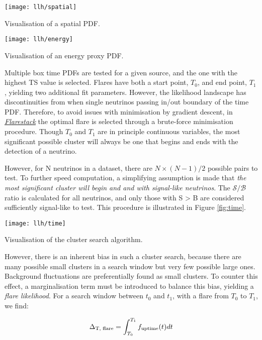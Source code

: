 \begin{marginfigure}
	\centering \texttt{[image: llh/spatial]}
	\caption{Visualisation of a spatial PDF.}
	\label{fig:spatial}
\end{marginfigure}

\begin{marginfigure}
	\centering \texttt{[image: llh/energy]}
	\caption{Visualisation of an energy proxy PDF.}
	\label{fig:energy}
\end{marginfigure}

Multiple box time PDFs are tested for a given source, and the one with the highest TS value is selected. Flares have both a start point, $T_{0}$, and end point, $T_{1}$, yielding two additional fit parameters. However, the likelihood landscape has discontinuities from when single neutrinos passing in/out boundary of the time PDF. Therefore, to avoid issues with minimisation by gradient descent, in \emph{\href{https://github.com/IceCubeOpenSource/flarestack}{Flarestack}} the optimal flare is selected through a brute-force minimisation procedure. Though $T_{0}$ and $T_{1}$ are in principle continuous variables, the most significant possible cluster will always be one that begins and ends with the detection of a neutrino.

However, for N neutrinos in a dataset, there are $N \times (N-1)/2$ possible pairs to test. To further speed computation, a simplifying assumption is made that \emph{the most significant cluster will begin and and with signal-like neutrinos}. The $\mathcal{S}/\mathcal{B}$ ratio is calculated for all neutrinos, and only those with S > B are considered sufficiently signal-like to test. This procedure is illustrated in Figure \ref{fig:time}.

\begin{marginfigure}
	\centering \texttt{[image: llh/time]}
	\caption{Visualisation of the cluster search algorithm.}
	\label{fig:time}
\end{marginfigure}

However, there is an inherent bias in such a cluster search, because there are many possible small clusters in a search window but very few possible large ones. Background fluctuations are preferentially found as small clusters. To counter this effect, a marginalisation term must be introduced to balance this bias, yielding a \emph{flare likelihood}. For a search window between $t_{0}$ and $t_{1}$, with a flare from $T_{0}$ to $T_{1}$, we find:

\begin{equation}
\Delta_{\textup{T, flare}} = \int_{T_{0}}^{T_{1}}f_{\textup{uptime}}(t) dt
\end{equation}

